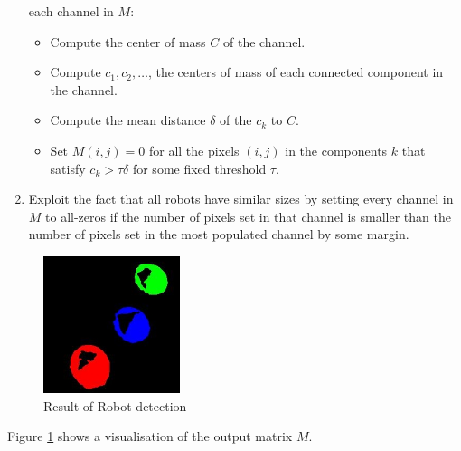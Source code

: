 \documentclass[10pt,a4paper]{article}
\begin{document}
\begin{enumerate}
    each channel in $M$:
    \begin{itemize}
        \item
        Compute the center of mass $C$ of the channel.
        \item
        Compute $c_1, c_2, \ldots$, the centers of mass of each connected 
        component in the channel.
        \item
        Compute the mean distance $\delta$ of the $c_k$ to $C$.
        \item
        Set $M(i,j) = 0$ for all the pixels $(i,j)$ in the components $k$ that
        satisfy $c_k > \tau \delta$ for some fixed threshold $\tau$.
    \end{itemize}
    \item
    Exploit the fact that all robots have similar sizes by setting every channel
    in $M$ to all-zeros if the number of pixels set in that channel is smaller
    than the number of pixels set in the most populated channel by some margin.
\end{enumerate} 
\begin{figure}[ht]
    \centering
    \includegraphics[width=40mm]{d1_i5_blob_mask.jpg}
    \caption{Result of Robot detection}
    \label{colorfig}
\end{figure} 
Figure \ref{colorfig} shows a visualisation of the output matrix $M$.
\end{document}

